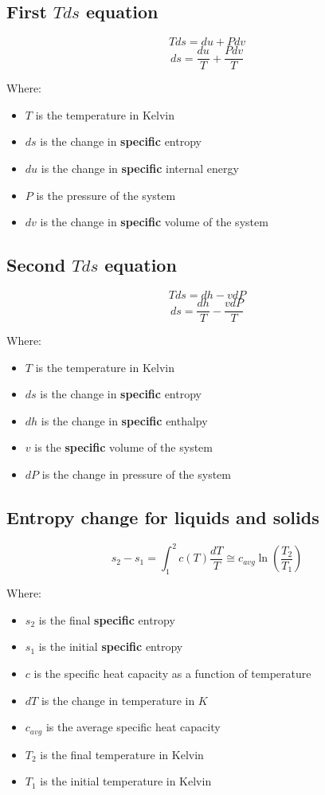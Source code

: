 \documentclass[11pt]{article}
\begin{document}
 \newpage

\subsection{First \(Tds\) equation}
\label{sec:orgb359268}
\[T ds = du + P dv\]
\[ds = \frac{du}{T} + \frac{P dv}{T}\]

Where:
\begin{itemize}
\item \(T\) is the temperature in Kelvin
\item \(ds\) is the change in \textbf{specific} entropy
\item \(du\) is the change in \textbf{specific} internal energy
\item \(P\) is the pressure of the system
\item \(dv\) is the change in \textbf{specific} volume of the system
\end{itemize}

\subsection{Second \(Tds\) equation}
\label{sec:org43c5ae3}
\[T ds = dh - v dP\]
\[ds = \frac{dh}{T} - \frac{v dP}{T}\]

Where:
\begin{itemize}
\item \(T\) is the temperature in Kelvin
\item \(ds\) is the change in \textbf{specific} entropy
\item \(dh\) is the change in \textbf{specific} enthalpy
\item \(v\) is the \textbf{specific} volume of the system
\item \(dP\) is the change in pressure of the system
\end{itemize}

 \newpage

\subsection{Entropy change for liquids and solids}
\label{sec:org41c84c8}
\[s_2 - s_1 = \int_1^2 c(T) \frac{dT}{T} \cong c_{avg} \ln \left( \frac{T_2}{T_1} \right)\]

Where:
\begin{itemize}
\item \(s_2\) is the final \textbf{specific} entropy
\item \(s_1\) is the initial \textbf{specific} entropy
\item \(c\) is the specific heat capacity as a function of temperature
\item \(dT\) is the change in temperature in \(\unit{K}\)
\item \(c_{avg}\) is the average specific heat capacity
\item \(T_2\) is the final temperature in Kelvin
\item \(T_1\) is the initial temperature in Kelvin
\end{itemize}
\end{document}
